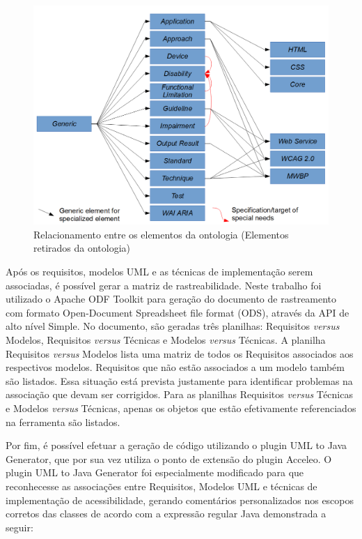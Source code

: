 \documentclass[runningheads,a4paper]{llncs}
\begin{document}
\begin{figure}[h!]
\centering
\includegraphics[scale=0.18]{./img/ontologyrelationship.png}
\caption{Relacionamento entre os elementos da ontologia (Elementos retirados
da ontologia)}
\label{fig:ontologyrelationship}
\end{figure}

Após os requisitos, modelos UML e as técnicas de implementação serem associadas, é possível gerar a matriz de rastreabilidade.
Neste trabalho foi utilizado o Apache ODF Toolkit para geração do documento de rastreamento com formato Open-Document Spreadsheet file format (ODS), através da API de alto nível Simple. No documento, são geradas três planilhas: Requisitos \textit{versus} Modelos, Requisitos \textit{versus} Técnicas e Modelos \textit{versus} Técnicas. A planilha Requisitos \textit{versus} Modelos lista uma matriz de todos os Requisitos associados aos respectivos modelos. Requisitos que não estão associados a um modelo também são listados. Essa situação está prevista
justamente para identificar problemas na associação que devam ser corrigidos. Para as
planilhas Requisitos \textit{versus} Técnicas e Modelos \textit{versus} Técnicas, apenas os objetos que
estão efetivamente referenciados na ferramenta são listados.

Por fim, é possível efetuar a geração de código utilizando o plugin UML to Java Generator, que por sua vez utiliza o ponto de extensão do plugin Acceleo.
O plugin UML to Java Generator foi especialmente modificado para que reconhecesse as associações entre Requisitos, Modelos UML e técnicas de implementação de acessibilidade, gerando comentários personalizados nos escopos corretos das classes de acordo com a expressão regular Java demonstrada a seguir:
\end{document}
